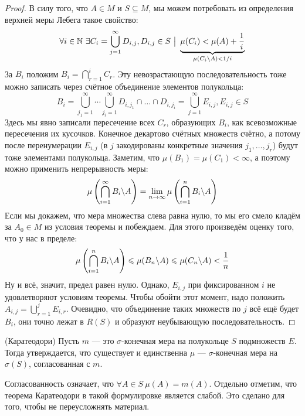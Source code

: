 \begin{proof}
	В силу того, что $A \in M$ и $S \subseteq M$, мы можем потребовать из определения верхней меры Лебега такое свойство:
	\[
		\forall i \in \mathbb{N}\ \exists C_i = \bigcup_{j = 1}^\infty D_{i, j}, D_{i, j} \in S \ \big|\  \underbrace{\mu(C_i) < \mu(A) + \frac{1}{i}}_{\mu(C_i \backslash A) < 1 / i}
	\]
	За $B_i$ положим $B_i = \bigcap_{r = 1}^i C_r$. Эту невозрастающую последовательность тоже можно записать через счётное объединение элементов полукольца:
	\[
		B_i = \bigcup_{j_1 = 1}^\infty \cdots \bigcup_{j_i = 1}^\infty D_{i, j_1} \cap \ldots \cap D_{i, j_i} = \bigcup_{j = 1}^\infty E_{i, j}, E_{i, j} \in S
	\]
	Здесь мы явно записали пересечение всех $C_r$, образующих $B_i$, как всевозможные пересечения их кусочков. Конечное декартово счётных множеств счётно, а потому после перенумерации $E_{i, j}$ (в $j$ закодированы конкретные значения $j_1, \ldots, j_r$) будут тоже элементами полукольца. Заметим, что $\mu(B_1) = \mu(C_1) < \infty$, а поэтому можно применить непрерывность меры:
	\[
		\mu\left(\bigcap_{i = 1}^\infty B_i \backslash A\right) = \lim_{n \to \infty} \mu\left(\bigcap_{i = 1}^n B_i \backslash A\right)
	\]
	Если мы докажем, что мера множества слева равна нулю, то мы его смело кладём за $A_0 \in M$ из условия теоремы и побеждаем. Для этого произведём оценку того, что у нас в пределе:
	\[
		\mu\left(\bigcap_{i = 1}^n B_i \backslash A\right) \leqslant \mu(B_n \backslash A) \leqslant \mu(C_n \backslash A) < \frac{1}{n}
	\]
	Ну и всё, значит, предел равен нулю. Однако, $E_{i, j}$ при фиксированном $i$ не удовлетворяют условиям теоремы. Чтобы обойти этот момент, надо положить $A_{i, j} = \bigcup_{r = 1}^j E_{i, r}$. Очевидно, что объединение таких множеств по $j$ всё ещё будет $B_i$, они точно лежат в $R(S)$ и образуют неубывающую последовательность.
\end{proof}

\begin{theorem} (Каратеодори)
	Пусть $m$ --- это $\sigma$-конечная мера  на полукольце $S$ подмножеств $E$. Тогда утверждается, что существует и единственна $\mu$ --- $\sigma$-конечная мера на $\sigma(S)$, согласованная с $m$.
\end{theorem}

\begin{note}
	Согласованность означает, что $\forall A \in S\ \mu(A) = m(A)$. Отдельно отметим, что теорема Каратеодори в такой формулировке является слабой. Это сделано для того, чтобы не переусложнять материал.
\end{note}

